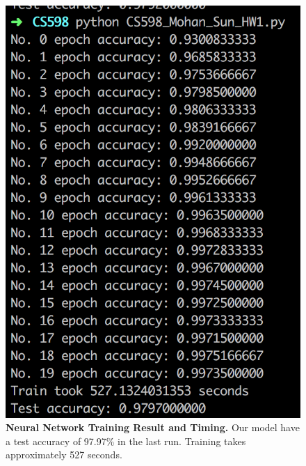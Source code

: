 \documentclass[reqno,12pt]{article}
\begin{document}
\begin{figure}[!t]
  \centering 
  \includegraphics[width = \textwidth]{HW1_result.png}

  \vskip0.25cm

  \caption{\textnormal{\bf Neural Network Training Result and Timing.} Our model have a 
  test accuracy of 97.97\% in the last run. Training takes approximately 527 seconds.}
  \label{fig:res}
\end{figure}
\end{document}
